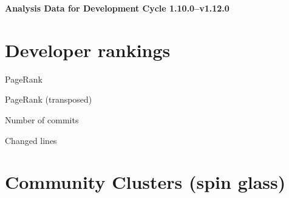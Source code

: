 \documentclass{article}
\begin{document}
\setlength{\parindent}{0pt}
\begin{center}
\begin{Large}
\textbf{Analysis Data for Development Cycle 1.10.0--v1.12.0}
\end{Large}
\end{center}
\section{Developer rankings}
\begin{small}\renewcommand{\tabcolsep}{1pt}
\begin{minipage}{0.5\linewidth}
PageRank\\

\end{minipage}%
\begin{minipage}{0.5\linewidth}
PageRank (transposed)\\

\end{minipage}

\renewcommand{\tabcolsep}{5pt}
\begin{minipage}{0.5\linewidth}
Number of commits\\

\end{minipage}%
\begin{minipage}{0.5\linewidth}
Changed lines\\

\end{minipage}
\end{small}
\newpage\section{Community Clusters (spin glass)}
\end{document}
